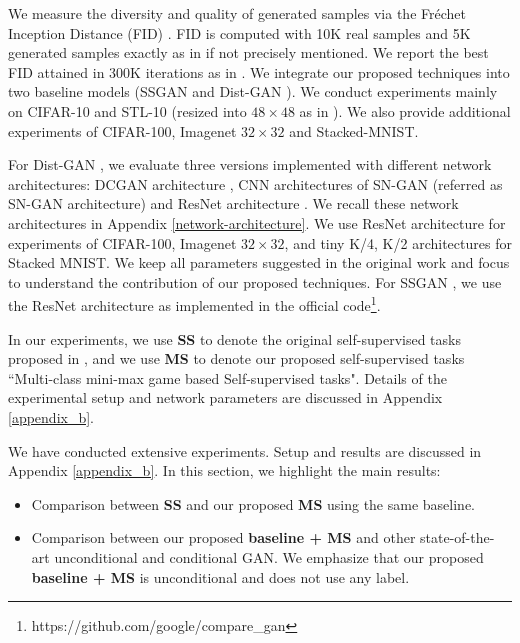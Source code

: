 \documentclass{article}
\begin{document}
We measure the diversity and quality of generated samples via the Fr\'echet Inception Distance (FID) \cite{heusel-arxiv-2017}. FID is computed with 10K real samples and 5K generated samples exactly as in \cite{miyato-iclr-2018} if not precisely mentioned. 
We report the best FID attained in 300K iterations as in \cite{xiang-arxiv-2017, li-nips-2017, tran-eccv-2018, yazici-arxiv-2018}.
We integrate our proposed techniques into two baseline models (SSGAN \cite{chen-arxiv-2018} and Dist-GAN \cite{tran-eccv-2018}). We conduct experiments mainly on CIFAR-10 and STL-10 (resized into $48 \times 48$ as in \cite{miyato-iclr-2018}). We also provide additional experiments of CIFAR-100, Imagenet $32\times32$ and Stacked-MNIST.

For Dist-GAN \cite{tran-eccv-2018}, we evaluate three versions implemented with different network architectures: DCGAN architecture \cite{radford-arxiv-2015}, CNN architectures of SN-GAN \cite{miyato-iclr-2018} (referred as SN-GAN architecture) and ResNet architecture \cite{gulrajani-arxiv-2017}. We recall these network architectures in Appendix \ref{network-architecture}. We use ResNet architecture \cite{gulrajani-arxiv-2017} for experiments of CIFAR-100, Imagenet $32\times32$, and tiny K/4, K/2 architectures \cite{metz-arxiv-2016} for Stacked MNIST. We keep all parameters suggested in the original work and focus to understand the contribution of our proposed techniques. For SSGAN \cite{chen-arxiv-2018}, we use the ResNet architecture as implemented in the official code\footnote{https://github.com/google/compare\_gan}.

In our experiments, we use
{\bf SS}
to denote the original self-supervised tasks proposed in \cite{chen-arxiv-2018},  and we use {\bf MS} to denote our proposed self-supervised tasks ``Multi-class mini-max game based Self-supervised tasks". Details of the experimental setup and network parameters are discussed in Appendix \ref{appendix_b}.

We have conducted extensive experiments. Setup and results are discussed in Appendix \ref{appendix_b}.
In this section, we highlight the main results:
\begin{itemize}
  \item Comparison between {\bf SS} and our proposed {\bf MS} using the same baseline.
  \item Comparison between our proposed {\bf baseline + MS} and other state-of-the-art unconditional and conditional GAN. We emphasize that our proposed {\bf baseline + MS} is unconditional and does not use any label.
\end{itemize}
\end{document}
